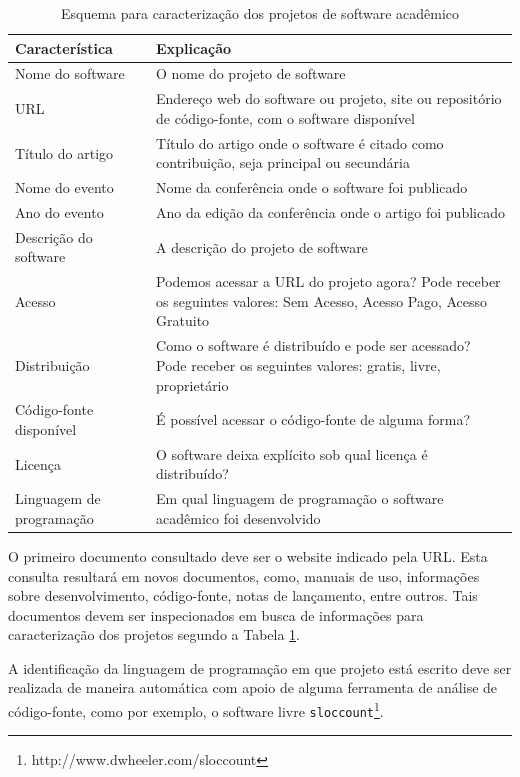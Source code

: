 \begin{table}[h]
\caption{Esquema para caracterização dos projetos de software acadêmico}
\centering
\begin{tabular}{ l p{11cm} }
  \hline
  Característica           & Explicação \\
  \hline
  Nome do software         & O nome do projeto de software \\
  URL                      & Endereço web do software ou projeto, site ou repositório de código-fonte, com o software disponível \\
  Título do artigo         & Título do artigo onde o software é citado como contribuição, seja principal ou secundária \\
  Nome do evento           & Nome da conferência onde o software foi publicado \\
  Ano do evento            & Ano da edição da conferência onde o artigo foi publicado \\
  Descrição do software    & A descrição do projeto de software \\
  Acesso                   & Podemos acessar a URL do projeto agora? Pode receber os seguintes valores: Sem Acesso, Acesso Pago, Acesso Gratuito \\
  Distribuição             & Como o software é distribuído e pode ser acessado? Pode receber os seguintes valores: gratis, livre, proprietário \\
  Código-fonte disponível  & É possível acessar o código-fonte de alguma forma? \\
  Licença                  & O software deixa explícito sob qual licença é distribuído? \\
  Linguagem de programação & Em qual linguagem de programação o software acadêmico foi desenvolvido \\
  \hline
\end{tabular}
\label{esquema-caracteristicas}
\end{table}

O primeiro documento consultado deve ser o website indicado pela URL. Esta
consulta resultará em novos documentos, como, manuais de uso, informações sobre
desenvolvimento, código-fonte, notas de lançamento, entre outros. 
Tais documentos devem ser inspecionados em busca de informações para
caracterização dos projetos segundo a Tabela \ref{esquema-caracteristicas}.

A identificação da linguagem de programação em que projeto está escrito deve ser
realizada de maneira automática com apoio de alguma ferramenta de análise de
código-fonte, como por exemplo, o software livre
\texttt{sloccount}\footnote{http://www.dwheeler.com/sloccount}.

